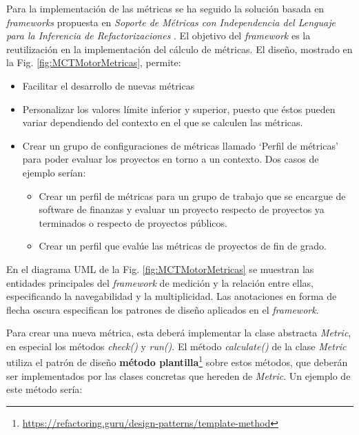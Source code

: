 Para la implementación de las métricas se ha seguido la solución basada en \textit{frameworks} propuesta en \textit{Soporte de Métricas con Independencia del Lenguaje para la Inferencia de Refactorizaciones} \cite{marticorena_sanchez_soporte_2005}. El objetivo del \textit{framework} es la reutilización en la implementación del cálculo de métricas. El diseño, mostrado en la Fig. \ref{fig:MCTMotorMetricas}, permite:

\begin{itemize}
	\tightlist
	\item Facilitar el desarrollo de nuevas métricas
	\item Personalizar los valores límite inferior y superior, puesto que éstos pueden variar dependiendo del contexto en el que se calculen las métricas.
	\item Crear un grupo de configuraciones de métricas llamado `Perfil de métricas' para poder evaluar los proyectos en torno a un contexto. Dos casos de ejemplo serían:
	\begin{itemize}
		\tightlist
		\item Crear un perfil de métricas para un grupo de trabajo que se encargue de software de finanzas y evaluar un proyecto respecto de proyectos ya terminados o respecto de proyectos públicos.
		\item Crear un perfil que evalúe las métricas de proyectos de fin de grado.
	\end{itemize}
\end{itemize}


En el diagrama UML de la Fig. \ref{fig:MCTMotorMetricas} se muestran las entidades principales del \textit{framework} de medición y la relación entre ellas, especificando la navegabilidad y la multiplicidad. Las anotaciones en forma de flecha oscura especifican los patrones de diseño \cite{gamma_patrones_2002} aplicados en el \textit{framework}.

Para crear una nueva métrica, esta deberá implementar la clase abstracta \textit{Metric}, en especial los métodos \textit{check()} y \textit{run()}. El método \textit{calculate()} de la clase \textit{Metric} utiliza el patrón de diseño \textbf{método plantilla}\footnote{\url{https://refactoring.guru/design-patterns/template-method}} sobre estos métodos, que deberán ser implementados por las clases concretas que hereden de \textit{Metric}. Un ejemplo de este método sería:

